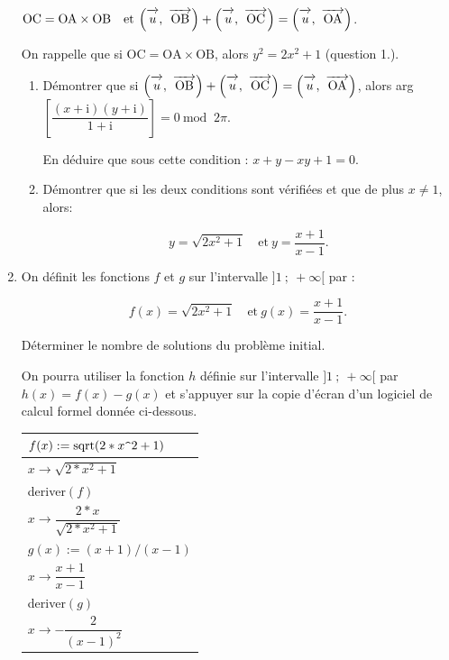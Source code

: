 \documentclass[10pt,a4paper]{article}
\newcommand{\vect}[1]{\overrightarrow{\,\mathstrut#1\,}}
\begin{document}
\begin{enumerate}
$\text{OC} = \text{OA} \times \text{OB} \quad \text{et}\:  \left(\vect{u},~\vect{\text{OB}}\right) + \left(\vect{u},~\vect{\text{OC}}\right) = \left(\vect{u},~\vect{\text{OA}}\right)$.
	
On rappelle que si $\text{OC} = \text{OA} \times \text{OB}$, alors $y^2 = 2x^2 + 1$ (question 1.).
	\begin{enumerate}
		\item Démontrer que si $\left(\vect{u},~\vect{\text{OB}}\right) + \left(\vect{u},~\vect{\text{OC}}\right) = \left(\vect{u},~\vect{\text{OA}}\right)$, alors arg$\left[\dfrac{(x + \text{i})(y + \text{i})}{1 + \text{i}}\right] = 0 \:\text{mod }\: 2\pi$.

En déduire que sous cette condition : $x + y - xy + 1 = 0$.
		\item Démontrer que si les deux conditions sont vérifiées et que de plus $x \neq 1$, alors:
		
\[y= \sqrt{2x^2 + 1}\quad \text{et} \: y = \dfrac{x + 1}{x - 1}.\]
	\end{enumerate}
\item On définit les fonctions $f$ et $g$ sur l'intervalle $]1~;~+ \infty[$ par :

\[f(x) = \sqrt{2x^2 + 1}\quad \text{et} \: g(x) = \dfrac{x + 1}{x - 1}.\]

Déterminer le nombre de solutions du problème initial.
	
On pourra utiliser la fonction $h$ définie sur l'intervalle $]1~;~+ \infty[$ par $h(x) = f(x) - g(x)$ et s'appuyer sur la copie d'écran d'un logiciel de calcul formel donnée ci-dessous.

\begin{center}
\renewcommand\arraystretch{1.9}
\begin{tabular}{|l|}\hline
$f(x) := \text{sqrt}(2*x\verb+^+2+1)$	\\ \hline
\hspace{1.5cm}$x \to  \sqrt{2*x^2+1}$	\\ \hline
deriver$(f)$							\\ \hline
\hspace{1.5cm}$x \to \dfrac{2*x}{\sqrt{2*x^2+ 1}}$\rule[-5mm]{0mm}{9mm}\\ \hline
$g(x) :=(x+1)/(x-1)$					\\ \hline
\hspace{1.5cm}$x \to \dfrac{x + 1}{x - 1}$\rule[-5mm]{0mm}{9mm}\\ \hline
deriver$(g)$							\\ \hline
\hspace{1.5cm}$x \to  - \dfrac{2}{(x - 1)^2}$\rule[-5mm]{0mm}{9mm}\\ \hline
\end{tabular}
\end{center}
\renewcommand\arraystretch{1}
\end{enumerate}
\end{document}
